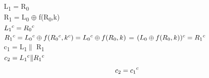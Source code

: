 \documentclass[11pt]{article}
\begin{document}
	L\textsubscript{1} = R\textsubscript{0}\\
	R\textsubscript{1} = L\textsubscript{0} $\oplus$ f(R\textsubscript{0},k)\\
	$L\textsubscript{1}^c = R\textsubscript{0}^c$\\
	$R\textsubscript{1}^c = L\textsubscript{0}^c \oplus f(R\textsubscript{0}^c,k^c) = L\textsubscript{0}^c \oplus f(R\textsubscript{0},k)$ = $(L\textsubscript{0} \oplus f(R\textsubscript{0},k))^c = R\textsubscript{1}^c$\\
	c\textsubscript{1} = L\textsubscript{1}$\|$ R\textsubscript{1}\\
	$c\textsubscript{2} = L\textsubscript{1}^c\| R\textsubscript{1}^c$\\
	$$c\textsubscript{2} = c\textsubscript{1}^c$$
\end{document}
